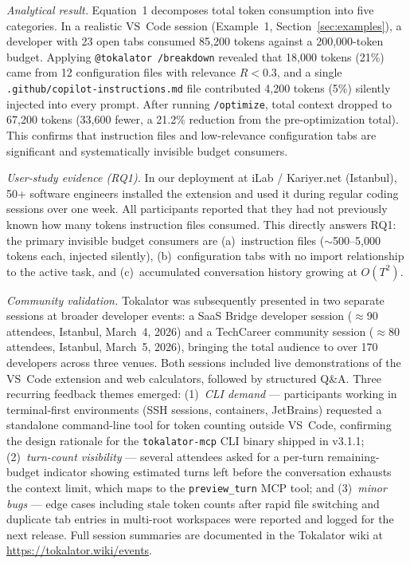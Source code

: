 \documentclass[a4paper,fleqn]{cas-dc}
\begin{document}
\textit{Analytical result.} Equation~1 decomposes total token consumption into five categories. In a realistic VS~Code session (Example~1, Section~\ref{sec:examples}), a developer with 23 open tabs consumed 85,200 tokens against a 200,000-token budget. Applying \texttt{@tokalator /breakdown} revealed that 18,000 tokens (21\%) came from 12 configuration files with relevance $R < 0.3$, and a single \texttt{.github/copilot-instructions.md} file contributed 4,200 tokens (5\%) silently injected into every prompt. After running \texttt{/optimize}, total context dropped to 67,200 tokens (33,600 fewer, a 21.2\% reduction from the pre-optimization total). This confirms that instruction files and low-relevance configuration tabs are significant and systematically invisible budget consumers.

\textit{User-study evidence (RQ1).} In our deployment at iLab / Kariyer.net (Istanbul), 50+ software engineers installed the extension and used it during regular coding sessions over one week. All participants reported that they had not previously known how many tokens instruction files consumed. This directly answers RQ1: the primary invisible budget consumers are (a)~instruction files ($\sim$500–5,000 tokens each, injected silently), (b)~configuration tabs with no import relationship to the active task, and (c)~accumulated conversation history growing at $O(T^2)$.

\textit{Community validation.} Tokalator was subsequently presented in two separate sessions at broader developer events: a SaaS Bridge developer session ($\approx$90 attendees, Istanbul, March~4, 2026) and a TechCareer community session ($\approx$80 attendees, Istanbul, March~5, 2026), bringing the total audience to over 170 developers across three venues. Both sessions included live demonstrations of the VS~Code extension and web calculators, followed by structured Q\&A. Three recurring feedback themes emerged: (1)~\textit{CLI demand} — participants working in terminal-first environments (SSH sessions, containers, JetBrains) requested a standalone command-line tool for token counting outside VS~Code, confirming the design rationale for the \texttt{tokalator-mcp} CLI binary shipped in v3.1.1; (2)~\textit{turn-count visibility} — several attendees asked for a per-turn remaining-budget indicator showing estimated turns left before the conversation exhausts the context limit, which maps to the \texttt{preview\_turn} MCP tool; and (3)~\textit{minor bugs} — edge cases including stale token counts after rapid file switching and duplicate tab entries in multi-root workspaces were reported and logged for the next release. Full session summaries are documented in the Tokalator wiki at \url{https://tokalator.wiki/events}.
\end{document}
